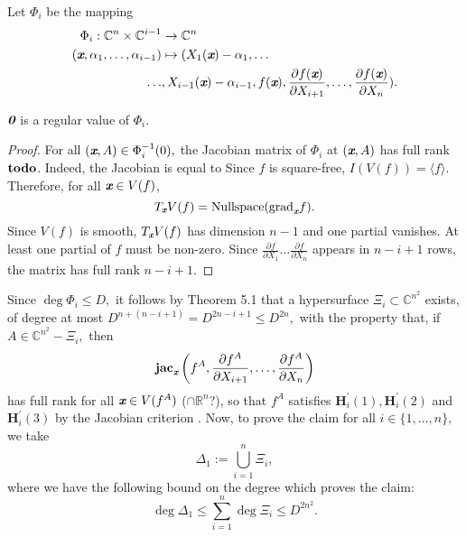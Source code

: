 \documentclass[sigconf]{acmart}
\def\td{{\bf todo}}
\def\bz{\textit{\textbf{0}}}
\def\xb{\textit{\textbf{x}}}
\def\C{\mathbb{C}}
\def\R{\mathbb{R}}
\def\jac{ \textbf{jac}}
\def\grad{\textrm{grad}}
\def\pa{\partial}
\begin{document}
Let $\Phi_i$ be the mapping 
%
\begin{align*}
    \Phi_i: \C^n \times \C^{i-1} &\rightarrow \C^{n} \\
           (\xb,\alpha_1,\hdots,\alpha_{i-1}) &\mapsto 
       (X_1(\xb)-\alpha_1,\hdots \\
       \hdots &,X_{i-1}(\xb)-\alpha_{i-1}, f(\xb),\frac{\pa f(\xb)}{\pa X_{i+1}},\hdots,\frac{\pa f(\xb)}{\pa X_n} ).
\end{align*}
%
\begin{proposition}
$\bz$ is a regular value of $\Phi_i.$
\end{proposition} 
\begin{proof}
For all $(\xb,A) \in \Phi_i^{-1}(0),$ the Jacobian matrix of $\Phi_i$ at $(\xb,A)$ has full rank $\td$. Indeed, the Jacobian is equal to
Since $f$ is square-free, $I(V(f)) = \langle f \rangle.$ Therefore, for all $\xb \in V(f)$, 
\[
T_{\xb} V(f) = \textrm{Nullspace}(\grad_{\xb} f).
\]
Since $V(f)$ is smooth, $T_{\xb} V(f)$ has dimension $n-1$ and one partial vanishes. At least one partial of $f$ must be non-zero. Since  $\frac{\pa f}{\pa X_1} \hdots \frac{\pa f}{\pa X_n}$ appears in $n-i+1$ rows, the matrix has full rank $n-i+1$.
\end{proof}
%
Since $\deg \Phi_i \leq D,$ it follows by Theorem 5.1 that a hypersurface $\Xi_i \subset \C^{n^2}$ exists, of degree at most $D^{n+(n-i+1)}=D^{2n-i+1}\leq D^{2n},$ with the property that, if $A \in \C^{n^2}-\Xi_i,$ then 
%
\[
 \jac_\xb \left(f^A,\frac{\pa f^A}{\pa X_{i+1}},\hdots,\frac{\pa f^A}{\pa X_n}\right)
\]
has full rank for all $\xb \in V(f^A)$ ($\cap \R^n$?), so that  $f^A$ satisfies $\textbf{H}_i^{'}(1),\textbf{H}_i^{'}(2)$ and $\textbf{H}_i^{'}(3)$ by the Jacobian criterion \cite[Theorem 16.19]{ECA}. Now, to prove the claim for all $i \in \{1,\hdots,n\},$ we take
\[
\Delta_1 := \bigcup_{i=1}^n \Xi_i,
\]
where we have the following bound on the degree which proves the claim:
\[
\deg \Delta_1 \leq \sum_{i=1}^n \deg \Xi_i  \leq D^{2n^2}.
\] 
\end{document}
